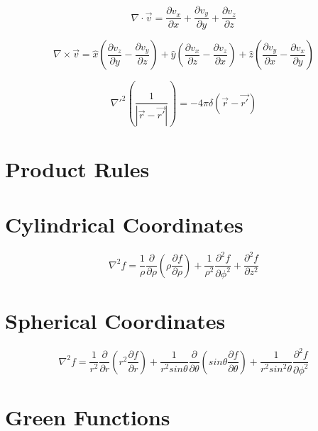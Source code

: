 \begin{equation}
	\nabla \cdot \vec v =  \frac{\partial v_x}{\partial x} + \frac{\partial v_y}{\partial y} + \frac{\partial v_z}{\partial z} 
\end{equation}

\begin{equation}
	\nabla \times \vec v = 
	\hat x \left( \frac{\partial v_z}{\partial y} - \frac{\partial v_y}{\partial z} \right) 
	+ \hat y \left( \frac{\partial v_x}{\partial z} - \frac{\partial v_z}{\partial x} \right) 
	+ \hat z \left( \frac{\partial v_y}{\partial x} - \frac{\partial v_x}{\partial y} \right)
\end{equation}

\begin{equation}
	\nabla'^2 \left(\frac{1}{|\vec{r} - \vec{r'}|}\right) = -4\pi \delta(\vec{r} - \vec{r'})
\end{equation}

\section{Product Rules}

\section{Cylindrical Coordinates}

\begin{equation}
	\nabla^2 f = \frac{1}{\rho}\frac{\partial}{\partial \rho}\left( \rho\frac{\partial f}{\partial \rho} \right)
	+ \frac{1}{\rho^2}\frac{\partial^2 f}{\partial \phi^2} 
	+ \frac{\partial^2 f}{\partial z^2}
\end{equation}

\section{Spherical Coordinates}

\begin{equation}
	\nabla^2 f = \frac{1}{r^2}\frac{\partial }{\partial r}\left( r^2 \frac{\partial f}{\partial r} \right)
	+ \frac{1}{r^2 sin \theta}\frac{\partial}{\partial \theta}\left(sin \theta \frac{\partial f}{\partial \theta}\right)
	+\frac{1}{r^2 sin^2 \theta}\frac{\partial^2 f}{\partial \phi^2}
\end{equation}

\section{Green Functions}

